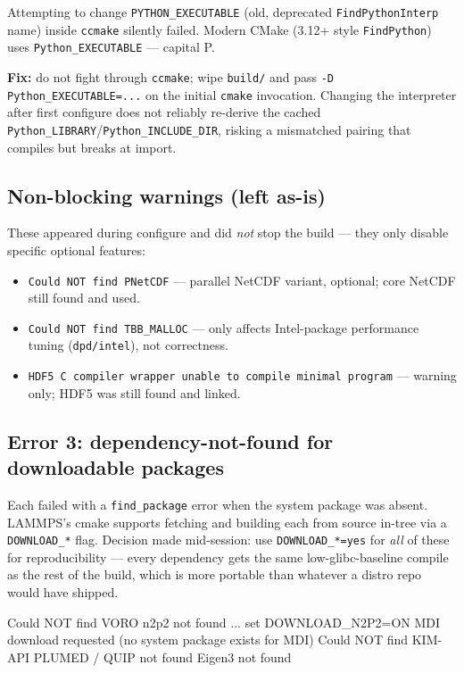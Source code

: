 \documentclass[11pt]{article}
\begin{document}
Attempting to change \texttt{PYTHON\_EXECUTABLE} (old, deprecated
\texttt{FindPythonInterp} name) inside \texttt{ccmake} silently failed.
Modern CMake (3.12+ style \texttt{FindPython}) uses \texttt{Python\_EXECUTABLE}
--- capital P.

\textbf{Fix:} do not fight through \texttt{ccmake}; wipe \texttt{build/} and
pass \texttt{-D Python\_EXECUTABLE=...} on the initial \texttt{cmake}
invocation.  Changing the interpreter after first configure does not reliably
re-derive the cached \texttt{Python\_LIBRARY}/\texttt{Python\_INCLUDE\_DIR},
risking a mismatched pairing that compiles but breaks at import.

\subsection{Non-blocking warnings (left as-is)}

These appeared during configure and did \emph{not} stop the build --- they only
disable specific optional features:
\begin{itemize}
  \item \texttt{Could NOT find PNetCDF} --- parallel NetCDF variant, optional;
    core NetCDF still found and used.
  \item \texttt{Could NOT find TBB\_MALLOC} --- only affects Intel-package
    performance tuning (\texttt{dpd/intel}), not correctness.
  \item \texttt{HDF5 C compiler wrapper unable to compile minimal program} ---
    warning only; HDF5 was still found and linked.
\end{itemize}

\subsection{Error 3: dependency-not-found for downloadable packages}

Each failed with a \texttt{find\_package} error when the system package was
absent.  LAMMPS's cmake supports fetching and building each from source in-tree
via a \texttt{DOWNLOAD\_*} flag.  Decision made mid-session: use
\texttt{DOWNLOAD\_*=yes} for \emph{all} of these for reproducibility --- every
dependency gets the same low-glibc-baseline compile as the rest of the build,
which is more portable than whatever a distro repo would have shipped.

\begin{codebox}[]
Could NOT find VORO
n2p2 not found ... set DOWNLOAD_N2P2=ON
MDI download requested   (no system package exists for MDI)
Could NOT find KIM-API
PLUMED / QUIP not found
Eigen3 not found
\end{codebox}
\end{document}
